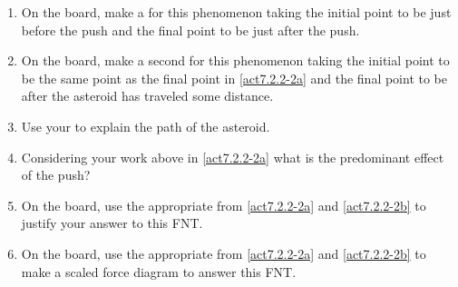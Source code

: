 \begin{fnt}
	
\end{fnt}

\begin{enumerate}
	\item On the board, make a \pchart{} for this phenomenon taking the initial point to be just before the push and the final point to be just after the push.
		\label{act7.2.2-2a}
	\item On the board, make a second \pchart{} for this phenomenon taking the initial point to be the same point as the final point in \eqref{act7.2.2-2a} and the final point to be after the asteroid has traveled some distance.
		\label{act7.2.2-2b}
	\item Use your \pcharts{} to explain the path of the asteroid.
	\item Considering your work above in \eqref{act7.2.2-2a} what is the predominant effect of the push?
\end{enumerate}
\vspace{-6pt}
\WCD
\vspace{6pt}

\begin{fnt}
	
\end{fnt}

\begin{enumerate}\setcounter{enumi}{4}
	\item On the board, use the appropriate \pchart{} from %
	\eqref{act7.2.2-2a} and \eqref{act7.2.2-2b}
	 to justify your answer to this FNT.
\end{enumerate}
\vspace{-6pt}
\WCD
\vspace{6pt}

\begin{fnt}
	
\end{fnt}

\begin{enumerate}\setcounter{enumi}{5}
	\item On the board, use the appropriate \pchart{} from %
	\eqref{act7.2.2-2a} and \eqref{act7.2.2-2b}
	 to make a scaled force diagram to answer this FNT.
\end{enumerate}
\vspace{-6pt}
\WCD

